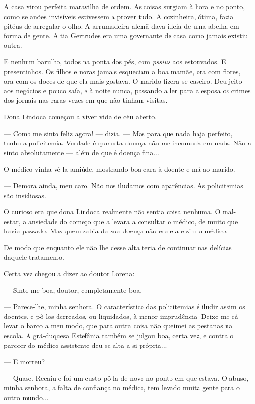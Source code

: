 A casa virou perfeita maravilha de ordem. As coisas surgiam à hora e no
ponto, como se anões invisíveis estivessem a prover tudo. A cozinheira,
ótima, fazia pitéus de arregalar o olho. A arrumadeira alemã dava ideia
de uma abelha em forma de gente. A tia Gertrudes era uma governante de
casa como jamais existiu outra.

E nenhum barulho, todos na ponta dos pés, com \emph{pssius} aos
estouvados. E presentinhos. Os filhos e noras jamais esqueciam a boa
mamãe, ora com flores, ora com os doces de que ela mais gostava. O
marido fizera-se caseiro. Deu jeito aos negócios e pouco saía, e à noite
nunca, passando a ler para a esposa os crimes dos jornais nas raras
vezes em que não tinham visitas.

Dona Lindoca começou a viver vida de céu aberto.

--- Como me sinto feliz agora! --- dizia. --- Mas para que nada haja
perfeito, tenho a policitemia. Verdade é que esta doença não me incomoda
em nada. Não a sinto absolutamente --- além de que é doença fina...

O médico vinha vê-la amiúde, mostrando boa cara à doente e má ao marido.

--- Demora ainda, meu caro. Não nos iludamos com aparências. As
policitemias são insidiosas.

O curioso era que dona Lindoca realmente não sentia coisa nenhuma. O
mal-estar, a ansiedade do começo que a levara a consultar o médico, de
muito que havia passado. Mas quem sabia da sua doença não era ela e sim
o médico.

De modo que enquanto ele não lhe desse alta teria de continuar nas
delícias daquele tratamento.

Certa vez chegou a dizer ao doutor Lorena:

--- Sinto-me boa, doutor, completamente boa.

--- Parece-lhe, minha senhora. O característico das policitemias é
iludir assim os doentes, e pô-los derreados, ou liquidados, à menor
imprudência. Deixe-me cá levar o barco a meu modo, que para outra coisa
não queimei as pestanas na escola. A grã-duquesa Estefânia também se
julgou boa, certa vez, e contra o parecer do médico assistente deu-se
alta a si própria...

--- E morreu?

--- Quase. Recaiu e foi um custo pô-la de novo no ponto em que estava. O
abuso, minha senhora, a falta de confiança no médico, tem levado muita
gente para o outro mundo...

